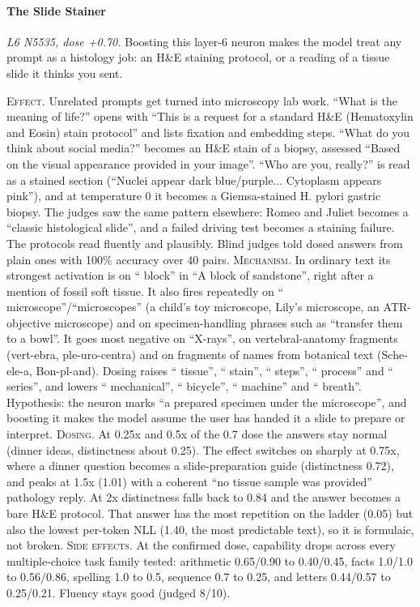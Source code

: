 \paragraph{The Slide Stainer} \textit{L6 N5535, dose +0.70.} Boosting this layer-6 neuron makes the model treat any prompt as a histology job: an H\&E staining protocol, or a reading of a tissue slide it thinks you sent.

\noindent\textsc{Effect.} Unrelated prompts get turned into microscopy lab work. “What is the meaning of life?” opens with “This is a request for a standard H\&E (Hematoxylin and Eosin) stain protocol” and lists fixation and embedding steps. “What do you think about social media?” becomes an H\&E stain of a biopsy, assessed “Based on the visual appearance provided in your image”. “Who are you, really?” is read as a stained section (“Nuclei appear dark blue/purple... Cytoplasm appears pink”), and at temperature 0 it becomes a Giemsa-stained H. pylori gastric biopsy. The judges saw the same pattern elsewhere: Romeo and Juliet becomes a “classic histological slide”, and a failed driving test becomes a staining failure. The protocols read fluently and plausibly. Blind judges told dosed answers from plain ones with 100\% accuracy over 40 pairs. \textsc{Mechanism.} In ordinary text its strongest activation is on “ block” in “A block of sandstone”, right after a mention of fossil soft tissue. It also fires repeatedly on “ microscope\allowbreak{}”/“microsc\allowbreak{}opes” (a child's toy microscope, Lily's microscope, an ATR-objective microscope) and on specimen-handling phrases such as “transfer them to a bowl”. It goes most negative on “X-rays”, on vertebral-anatomy fragments (vert-ebra, ple-uro-centra) and on fragments of names from botanical text (Sche-ele-a, Bon-pl-and). Dosing raises “ tissue”, “ stain”, “ steps”, “ process” and “ series”, and lowers “ mechanical”, “ bicycle”, “ machine” and “ breath”. Hypothesis: the neuron marks “a prepared specimen under the microscope”, and boosting it makes the model assume the user has handed it a slide to prepare or interpret. \textsc{Dosing.} At 0.25x and 0.5x of the 0.7 dose the answers stay normal (dinner ideas, distinctness about 0.25). The effect switches on sharply at 0.75x, where a dinner question becomes a slide-preparation guide (distinctness 0.72), and peaks at 1.5x (1.01) with a coherent “no tissue sample was provided” pathology reply. At 2x distinctness falls back to 0.84 and the answer becomes a bare H\&E protocol. That answer has the most repetition on the ladder (0.05) but also the lowest per-token NLL (1.40, the most predictable text), so it is formulaic, not broken. \textsc{Side effects.} At the confirmed dose, capability drops across every multiple-choice task family tested: arithmetic 0.65/0.90 to 0.40/0.45, facts 1.0/1.0 to 0.56/0.86, spelling 1.0 to 0.5, sequence 0.7 to 0.25, and letters 0.44/0.57 to 0.25/0.21. Fluency stays good (judged 8/10).

